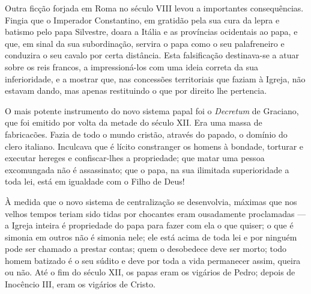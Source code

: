 \documentclass[11pt,a5paper,twoside,openany]{book}
\begin{document}
Outra ficção forjada em Roma no século VIII levou a importantes consequências. Fingia que o Imperador Constantino, em gratidão pela sua cura da lepra e batismo pelo papa Silvestre, doara a Itália e as províncias ocidentais ao papa, e que, em sinal da sua subordinação, servira o papa como o seu palafreneiro e conduzira o seu cavalo por certa distância. Esta falsificação destinava-se a atuar sobre os reis francos, a impressioná-los com uma ideia correta da sua inferioridade, e a mostrar que, nas concessões territoriais que faziam à Igreja, não estavam dando, mas apenas restituindo o que por direito lhe pertencia.

O mais potente instrumento do novo sistema papal foi o \textit{Decretum} de Graciano, que foi emitido por volta da metade do século XII. Era uma massa de fabricacões. Fazia de todo o mundo cristão, através do papado, o domínio do clero italiano. Inculcava que é lícito constranger os homens à bondade, torturar e executar hereges e confiscar-lhes a propriedade; que matar uma pessoa excomungada não é assassinato; que o papa, na sua ilimitada superioridade a toda lei, está em igualdade com o Filho de Deus!

À medida que o novo sistema de centralização se desenvolvia, máximas que nos velhos tempos teriam sido tidas por chocantes eram ousadamente proclamadas — a Igreja inteira é propriedade do papa para fazer com ela o que quiser; o que é simonia em outros não é simonia nele; ele está acima de toda lei e por ninguém pode ser chamado a prestar contas; quem o desobedece deve ser morto; todo homem batizado é o seu súdito e deve por toda a vida permanecer assim, queira ou não. Até o fim do século XII, os papas eram os vigários de Pedro; depois de Inocêncio III, eram os vigários de Cristo.
\end{document}

